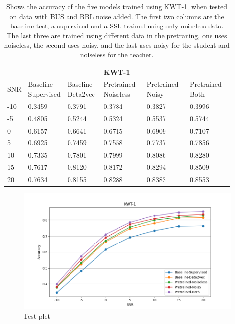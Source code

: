 \begin{table}[H]
    \centering
    \begin{tabular}{@{}llllll@{}}
        \multicolumn{6}{c}{\textbf{KWT-1}}\\
        \toprule
        SNR    & \makecell[l]{ Baseline - \\ Supervised } & \makecell[l]{ Baseline - \\ Deta2vec } & \makecell[l]{ Pretrained - \\ Noiseless } & \makecell[l]{ Pretrained - \\ Noisy } & \makecell[l]{ Pretrained - \\ Both } \\ \midrule
        -10  & 0.3459 & 0.3791 & 0.3784 & 0.3827 & 0.3996 \\
        -5   & 0.4805 & 0.5244 & 0.5324 & 0.5537 & 0.5744 \\
        0    & 0.6157 & 0.6641 & 0.6715 & 0.6909 & 0.7107 \\
        5    & 0.6925 & 0.7459 & 0.7558 & 0.7737 & 0.7856 \\
        10   & 0.7335 & 0.7801 & 0.7999 & 0.8086 & 0.8280 \\
        15   & 0.7617 & 0.8120 & 0.8172 & 0.8294 & 0.8509 \\
        20   & 0.7634 & 0.8155 & 0.8288 & 0.8383 & 0.8553 \\
        
        \bottomrule
    \end{tabular}
    \caption{Shows the accuracy of the five models trained using KWT-1, when tested on data with BUS and BBL noise added. The first two columns are the baseline test, a supervised and a SSL trained using only noiseless data. The last three are trained using different data in the pretraning, one uses noiseless, the second uses noisy, and the last uses noisy for the student and noiseless for the teacher.}
    \label{tab:KWT-1_snrmix_busxbbl}
\end{table}

\begin{figure}[H]
    \centering
    \includegraphics[width=\textwidth]{incl/img/results/kwt1_busxbbl.png}
    \caption{Test plot}
    \label{fig:KWT-1_snrmix_busxbbl}
\end{figure}


